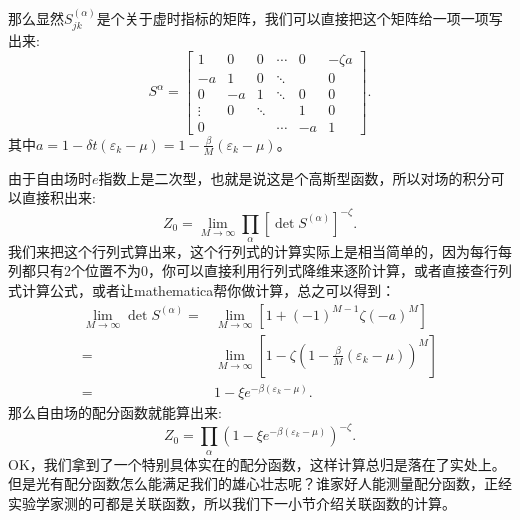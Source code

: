 \documentclass[12pt, a4paper, oneside]{ctexart}
\begin{document}
那么显然$S^{(\alpha)}_{jk}$是个关于虚时指标的矩阵，我们可以直接把这个矩阵给一项一项写出来:
\begin{equation}
    S^{\alpha}= \begin{bmatrix} 1 & 0 &0 & \cdots &0 & -\zeta a\\ -a & 1 &0 &\ddots & &0 \\ 0 & -a & 1 & \ddots & 0 & 0\\ \vdots & 0 &\ddots & & 1& 0\\ 0 & & & \cdots & -a & 1  \end{bmatrix}.
\end{equation}
其中$a=1-\delta t(\varepsilon_k-\mu)=1-\frac{\beta}{M}(\varepsilon_k-\mu)$。

由于自由场时$e$指数上是二次型，也就是说这是个高斯型函数，所以对场的积分可以直接积出来:
\begin{equation}
    Z_0=\lim_{M\rightarrow \infty}\prod_\alpha[\det S^{(\alpha)}]^{-\zeta}.
\end{equation}
我们来把这个行列式算出来，这个行列式的计算实际上是相当简单的，因为每行每列都只有2个位置不为0，你可以直接利用行列式降维来逐阶计算，或者直接查行列式计算公式，或者让mathematica帮你做计算，总之可以得到：
\begin{align} 
\lim_{M\rightarrow\infty}\det S^{(\alpha)}=&\lim_{M\rightarrow\infty}[1+(-1)^{M-1}\zeta(-a)^M]\nonumber\\ 
=&\lim_{M\rightarrow\infty}[1-\zeta(1-\frac{\beta}{M}(\varepsilon_k-\mu))^M]\nonumber\\ 
=&1-\xi e^{-\beta(\varepsilon_k-\mu)}.  
\end{align}
那么自由场的配分函数就能算出来:
\begin{equation}
    Z_0=\prod_\alpha(1-\xi e^{-\beta(\varepsilon_k-\mu)})^{-\zeta}.
\end{equation}
OK，我们拿到了一个特别具体实在的配分函数，这样计算总归是落在了实处上。但是光有配分函数怎么能满足我们的雄心壮志呢？谁家好人能测量配分函数，正经实验学家测的可都是关联函数，所以我们下一小节介绍关联函数的计算。
\end{document}
